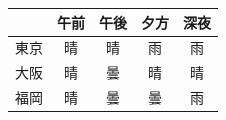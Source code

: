 \begin{center}
	\begin{tabular}{c|cccc}
		   & 午前 & 午後 & 夕方 & 深夜 \\\hline
		東京 & 晴  & 晴  & 雨  & 雨  \\
		大阪 & 晴  & 曇  & 晴  & 晴  \\
		福岡 & 晴  & 曇  & 曇  & 雨  \\\hline
	\end{tabular}
	\label{tbl::usingR_not_tidy}
\end{center}
